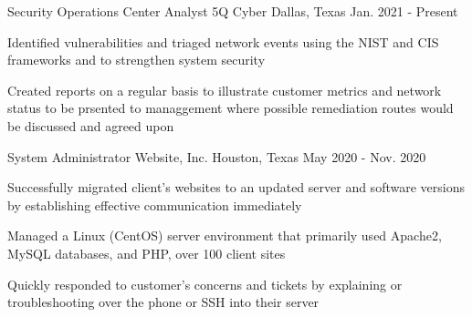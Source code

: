     \begin{cventries}
      \cventry
        {Security Operations Center Analyst} %
        {5Q Cyber} %
        {Dallas, Texas} %
        {Jan. 2021 - Present} %
        {
          \begin{cvitems}
            \item {Identified vulnerabilities and triaged network events using the NIST and CIS frameworks and to strengthen system security}
            \item {Created reports on a regular basis to illustrate customer metrics and network status to be prsented to managgement where possible remediation routes would be discussed and agreed upon}
            \item {}
          \end{cvitems}
        }


      \cventry
        {System Administrator} %
        {Website, Inc.} %
        {Houston, Texas} %
        {May 2020 - Nov. 2020} %
        {
          \begin{cvitems}
            \item {Successfully migrated client's websites to an updated server and software versions by establishing effective communication immediately}
            \item {Managed a Linux (CentOS) server environment that primarily used Apache2, MySQL databases, and PHP, over 100 client sites}
            \item {Quickly responded to customer's concerns and tickets by explaining or troubleshooting over the phone or SSH into their server}
          \end{cvitems}
        }
  \end{cventries}
